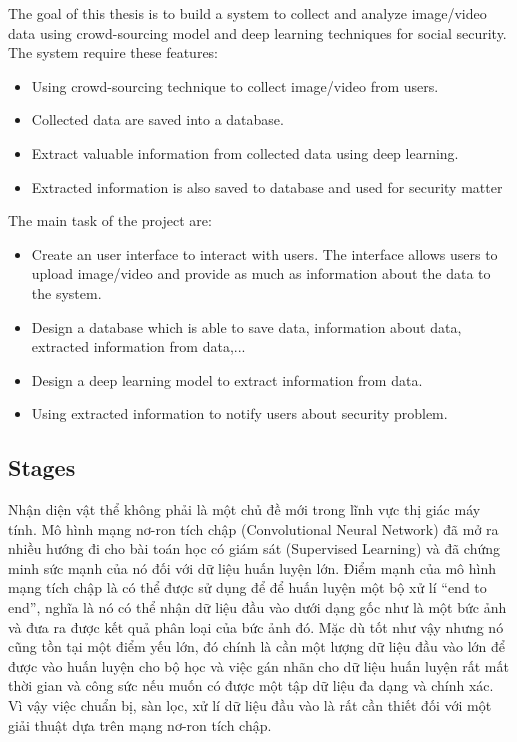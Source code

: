 The goal of this thesis is to build a system to collect and analyze image/video data using crowd-sourcing model and deep learning techniques for social security. The system require these features:
\begin{itemize}
	\item Using crowd-sourcing technique to collect image/video from users.
	\item Collected data are saved into a database.
	\item Extract valuable information from collected data using deep learning.
	\item Extracted information is also saved to database and used for security matter
\end{itemize} 
The main task of the project are:
\begin{itemize}
	\item Create an user interface to interact with users. The interface allows users to upload image/video and provide as much as information about the data to the system.
	\item Design a database which is able to save data, information about data, extracted information from data,...
	\item Design a deep learning model to extract information from data.
	\item Using extracted information to notify users about security problem.
\end{itemize} 

\subsection{Stages}
Nhận diện vật thể không phải là một chủ đề mới trong lĩnh vực thị giác máy tính. Mô hình mạng nơ-ron tích chập (Convolutional Neural Network) đã mở ra nhiều hướng đi cho bài toán học có giám sát (Supervised Learning) và đã chứng minh sức mạnh của nó đối với dữ liệu huấn luyện lớn. Điểm mạnh của mô hình mạng tích chập là có thể được sử dụng để để huấn luyện một bộ xử lí “end to end”, nghĩa là nó có thể nhận dữ liệu đầu vào dưới dạng gốc như là một bức ảnh và đưa ra được kết quả phân loại của bức ảnh đó. Mặc dù tốt như vậy nhưng nó cũng tồn tại một điểm yếu lớn, đó chính là cần một lượng dữ liệu đầu vào lớn để được vào huấn luyện cho bộ học và việc gán nhãn cho dữ liệu huấn luyện rất mất thời gian và công sức nếu muốn có được một tập dữ liệu đa dạng và chính xác. Vì vậy việc chuẩn bị, sàn lọc, xử lí dữ liệu đầu vào là rất cần thiết đối với một giải thuật dựa trên mạng nơ-ron tích chập.

